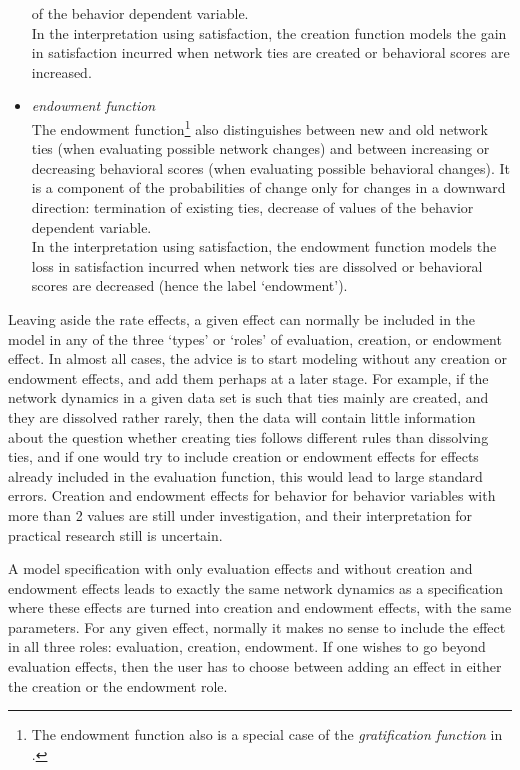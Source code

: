 \documentclass[a4paper,fleqn,11pt]{article}
\newcommand{\+}{\, + \,}
\begin{document}
\begin{itemize}
of the behavior dependent variable.\\
In the interpretation using satisfaction, the creation function
models the gain in satisfaction incurred when network ties are created
or behavioral scores are increased.\\
\item {\em endowment function}\\
The endowment function\footnote{The endowment function also is
a special case of the {\it gratification function} in \citet{Snijders01}.}
also distinguishes between new and old network
ties (when evaluating possible network changes) and between
increasing or decreasing behavioral scores (when evaluating
possible behavioral changes).
It is a component of the probabilities of change only for changes in
a downward direction: termination of existing ties, decrease of values
of the behavior dependent variable.\\
In the interpretation using satisfaction, the endowment function
models the loss in satisfaction incurred when network ties are dissolved or
behavioral scores are decreased (hence the label `endowment').
\end{itemize}

Leaving aside the rate effects, a given effect can normally be included
in the model in any of the three `types' or `roles' of
evaluation, creation, or endowment effect.
In almost all cases, the advice is to
start modeling without any creation or endowment effects,
and add them perhaps at a later stage.
For example, if the network dynamics in a given data set is such
that ties mainly are created, and they are dissolved rather rarely,
then the data will contain little information about the question whether
creating ties follows different rules than dissolving ties,
and if one would try to include   creation or endowment effects
for effects already included in the evaluation function,
this would lead to large standard errors.
Creation and endowment effects for behavior for behavior variables with more
than 2 values are still under investigation, and their interpretation
for practical research still is uncertain.

A model specification with only evaluation effects and without creation and
endowment effects leads to exactly the same network dynamics as a specification
where these effects are turned into creation and endowment effects,
with the same parameters.
For any given effect, normally it makes no sense to include the effect
in all three roles: evaluation, creation, endowment.
If one wishes to go beyond evaluation effects, then the user has to choose
between adding an effect in either the creation or the endowment role.
\end{document}
